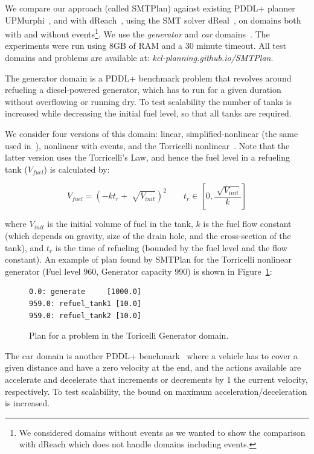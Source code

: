 We compare our approach (called SMTPlan) against existing PDDL+ planner UPMurphi~\cite{upmurphi}, and with dReach~\cite{bryce}, using the SMT solver dReal~\cite{gao12}, on domains both with and without events\footnote{We considered domains without events as we wanted to show the comparison with dReach which does not handle domains including events.}. We use the \textit{generator} and \textit{car} domains~\cite{bogomolov14}. The experiments were run using 8GB of RAM and a 30 minute timeout. All test domains and problems are available at: \textit{kcl-planning.github.io/SMTPlan}.

The generator domain is a PDDL+ benchmark problem that revolves around refueling a diesel-powered generator, which has to run for a given duration without overflowing or running dry. To test scalability the number of tanks is increased while decreasing the initial fuel level, so that all tanks are required.

We consider four versions of this domain: linear, simplified-nonlinear (the same used in~\cite{bryce}), nonlinear with events, and the Torricelli nonlinear~\cite{howey2003val}. Note that the latter version uses the Torricelli's Law, and hence the fuel level in a refueling tank ($V_{fuel}$) is calculated by:

\begingroup\makeatletter{}\check@mathfonts
\begin{equation}
	V_{fuel} = (-kt_r+\sqrt[]{V_{init}})^2 \qquad t_r \in \left[0, \frac{\sqrt[]{V_{init}}}{k}\right] 
\end{equation}
\label{vol_eq}
\endgroup

where $V_{init}$ is the initial volume of fuel in the tank, $k$ is the fuel flow constant (which depends on gravity, size of the drain hole, and the cross-section of the tank), and $t_r$ is the time of refueling (bounded by the fuel level and the flow constant). An example of plan found by SMTPlan for the Torricelli nonlinear generator (Fuel level 960, Generator capacity 990) is shown in Figure~\ref{fig:generatorplan}:

\begin{figure}[htb!]
\centering
\small
\begin{BVerbatim}
0.0: generate     [1000.0]
959.0: refuel_tank1 [10.0]
959.0: refuel_tank2 [10.0]
\end{BVerbatim}
\caption{Plan for a problem in the Toricelli Generator domain.}
\label{fig:generatorplan}
\end{figure}

The car domain is another PDDL+ benchmark~\cite{pddl+} where a vehicle has to cover a given distance and have a zero velocity at the end, and the actions available are accelerate and decelerate that increments or decrements by 1 the current velocity, respectively.
To test scalability, the bound on maximum acceleration/deceleration is increased.

